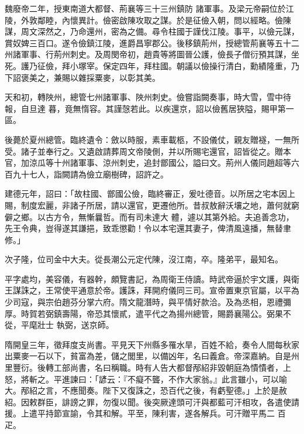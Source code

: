\begin{pinyinscope}
 魏廢帝二年，授東南道大都督、荊襄等三十三州鎮防
 諸軍事。及梁元帝嗣位於江陵，外敦鄰睦，內懷異計。儉密啟陳攻取之謀。於是征儉入朝，問以經略。儉陳謀，周文深然之，乃命還州，密為之備。尋令柱國于謹伐江陵。事平，以儉元謀，賞奴婢三百口。遂令儉鎮江陵，進爵昌寧郡公。後移鎮荊州，授總管荊襄等五十二州諸軍事、行荊州刺史。及周閔帝初，趙貴等將圖晉公護，儉長子僧衍預其謀，坐死。護乃征儉，拜小塚宰。保定四年，拜柱國。朝議以儉操行清白，勳績隆重，乃下詔褒美之，兼賜以雜採粟麥，以彰其美。



 天和初，轉陜州，總管七州諸軍事、陜州刺史。儉嘗詣闕奏事，時大雪，雪中待報，自旦達
 暮，竟無惰容。其謹愨若此。以疾還京，詔以儉舊居狹隘，賜甲第一區。



 後薨於夏州總管。臨終遺令：斂以時服，素車載柩，不設儀仗，親友贈襚，一無所受。諸子並奉行之。又遺啟請葬周文帝陵側，并以所賜宅還官，詔皆從之。贈本官，加涼瓜等十州諸軍事、涼州刺史，追封鄫國公，謚曰文。荊州人儀同趙超等六百九十七人，詣闕請為儉立廟樹碑，詔許之。



 建德元年，詔曰：「故柱國、鄫國公儉，臨終審正，爰吐德音。以所居之宅本因上賜，制度宏麗，非諸子所居，請以還官，更遷他所。昔叔敖辭沃壤之地，蕭何就窮僻之鄉。以古方令，無慚曩哲。而有司未達大
 體，遽以其第外給。夫追善念功，先王令典，豈得遂其謙挹，致乖懲勸！令以本宅還其妻子，俾清風遠播，無替聿修。」



 次子隆，位司金中大夫。從長潮公元定代陳，沒江南，卒。隆弟平，最知名。



 平字處均，美容儀，有器幹，頗覽書記，為周衛王侍讀。時武帝逼於宇文護，與衛王謀誅之，王常使平通意於帝。護誅，拜開府儀同三司。宣帝置東京官屬，以平為少司寇，與宗伯趙芬分掌六府。隋文龍潛時，與平情好款洽。及為丞相，恩禮彌厚。時賀若弼鎮壽陽，帝恐其懷貳，遣平代之為揚州總管，賜爵襄陽公。弼果不從，平麾壯士
 執弼，送京師。



 隋開皇三年，徵拜度支尚書。平見天下州縣多罹水旱，百姓不給，奏令人間每秋家出粟麥一石以下，貧富為差，儲之閭里，以備凶年，名曰義倉。帝深嘉納。自是州里豐衍。後轉工部尚書，名曰稱職。時有人告大都督邴紹非毀朝庭為憒憒者，上怒，將斬之。平進諫曰：「諺云：『不癡不聾，不作大家翁。』此言雖小，可以喻大。邴紹之言，不應聞奏。陛下又復誅之，恐百代之後，有虧聖德。」上於是赦紹。因敕群臣，誹謗之罪，勿復以聞。後突厥達頭可汗與都藍可汗相攻，各遣使請援。上遣平持節宣諭，令其和解。平至，陳利害，遂各解兵。可汗贈平馬二
 百疋。




\end{pinyinscope}
